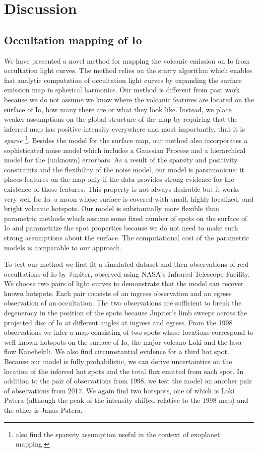 \documentclass[linenumbers,modern]{aastex62}
\begin{document}
\section{Discussion}
\label{sec:discussion}
\subsection{Occultation mapping of Io}
We have presented a novel method for mapping the volcanic emission on Io from occultation light curves.
The method relies on the \textsf{starry} algorithm which enables fast analytic computation of occultation light curves by expanding the surface emission map in spherical harmonics.
Our method is different from past work because we do not assume we know where the volcanic features are located on the surface of Io, how many there are or what they look like.
Instead, we place weaker assumptions on the global structure of the map by requiring that the inferred map has positive intensity everywhere and most importantly, that it is \emph{sparse} \footnote{\cite{aizawa2020} also find the sparsity assumption useful in the context of exoplanet mapping.}.
Besides the model for the surface map, our method also incorporates a sophisticated noise model which includes a Gaussian Process and a hierarchical model for the (unknown) errorbars.
As a result of the sparsity and positivity constraints and the flexibility of the noise model,
our model is parsimonious: it places features on the map only if the data provides strong evidence for the existence of those features.
This property is not always desirable but it works very well for Io, a moon whose surface is covered with small, highly localized, and bright volcanic hotspots.
Our model is substantially more flexible than parametric methods which assume some fixed number of spots on the surface of Io and parametrize the spot properties because we do not need to make such strong assumptions about the surface.
The computational cost of the parametric models is comparable to our approach.

To test our method we first fit a simulated dataset and then observations of real occultations of Io by Jupiter, observed using NASA's Infrared Telescope Facility.
We choose two pairs of light curves to demonstrate that the model can recover known hotspots.
Each pair consists of an ingress observation and an egress observation of an occultation. 
The two observations are sufficient to break the degeneracy in the position of the spots because Jupiter's limb sweeps across the projected disc of Io at different angles at ingress and egress.
From the 1998 observations we infer a map consisting of two spots whose locations correspond to well known hotspots on the surface of Io, the major volcano Loki and the lava flow Kanehekili.
We also find circumstantial evidence for a third hot spot.
Because our model is fully probabilistic, we can derive uncertainties on the location of the inferred hot spots and the total flux emitted from each spot.
In addition to the pair of observations from 1998, we test the model on another pair of observations from 2017.
We again find two hotspots, one of which is Loki Patera (although the peak of the intensity shifted relative to the 1998 map) and the other is Janus Patera.
\end{document}
